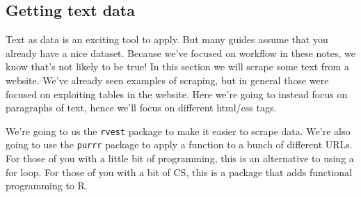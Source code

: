 \documentclass[
]{book}
\newenvironment{Shaded}{\begin{snugshade}}{\end{snugshade}}
\newcommand{\CommentTok}[1]{\textcolor[rgb]{0.56,0.35,0.01}{\textit{#1}}}
\newcommand{\KeywordTok}[1]{\textcolor[rgb]{0.13,0.29,0.53}{\textbf{#1}}}
\newcommand{\NormalTok}[1]{#1}
\newcommand{\OperatorTok}[1]{\textcolor[rgb]{0.81,0.36,0.00}{\textbf{#1}}}
\newcommand{\StringTok}[1]{\textcolor[rgb]{0.31,0.60,0.02}{#1}}
\begin{document}
\hypertarget{getting-text-data}{%
\subsection{Getting text data}\label{getting-text-data}}

Text as data is an exciting tool to apply. But many guides assume that you already have a nice dataset. Because we've focused on workflow in these notes, we know that's not likely to be true! In this section we will scrape some text from a website. We've already seen examples of scraping, but in general those were focused on exploiting tables in the website. Here we're going to instead focus on paragraphs of text, hence we'll focus on different html/css tags.

We're going to us the \texttt{rvest} package to make it easier to scrape data. We're also going to use the \texttt{purrr} package to apply a function to a bunch of different URLs. For those of you with a little bit of programming, this is an alternative to using a for loop. For those of you with a bit of CS, this is a package that adds functional programming to R.

\begin{Shaded}
\end{Shaded}
\end{document}
